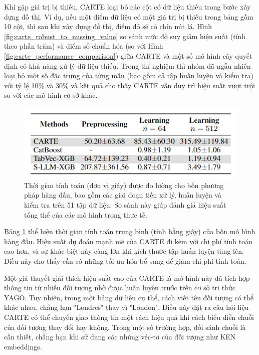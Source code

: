 \documentclass{article}
\begin{document}
Khi gặp giá trị bị thiếu, CARTE loại bỏ các cột có dữ liệu thiếu trong bước xây dựng đồ thị. Ví dụ, nếu một điểm dữ liệu có một giá trị bị thiếu trong bảng gồm 10 cột, thì sau khi xây dựng đồ thị, điểm đó sẽ có chín nút lá. Hình \ref{fig:carte_robust_to_missing_value} so sánh mức độ suy giảm hiệu suất (tính theo phần trăm) và điểm số chuẩn hóa (so với Hình \ref{fig:carte_performance_comparison}) giữa CARTE và một số mô hình cây quyết định có khả năng xử lý dữ liệu thiếu. Trong thí nghiệm thì nhóm đã ngẫu nhiên loại bỏ một số đặc trưng của từng mẫu (bao gồm cả tập huấn luyện và kiểm tra) với tỷ lệ 10\% và 30\% và kết quả cho thấy CARTE vẫn duy trì hiệu suất vượt trội so với các mô hình cơ sở khác.

\begin{figure} 
    \centering
    \includegraphics[scale = 0.8]{carte_computation_time.png}
    \caption{Thời gian tính toán (đơn vị giây) được đo lường cho bốn phương pháp hàng đầu, bao gồm các giai đoạn tiền xử lý, huấn luyện và kiểm tra trên 51 tập dữ liệu. So sánh này giúp đánh giá hiệu suất tổng thể của các mô hình trong thực tế.}
    \label{fig:carte_computation_time}
\end{figure}

Bảng \ref{fig:carte_computation_time} thể hiện thời gian tính toán trung bình (tính bằng giây) của bốn mô hình hàng đầu. Hiệu suất dự đoán mạnh mẽ của CARTE đi kèm với chi phí tính toán cao hơn, và sự khác biệt này càng lớn khi kích thước tập huấn luyện tăng lên. Điều này cho thấy cần có những tối ưu hóa bổ sung để giảm chi phí tính toán.

Một giả thuyết giải thích hiệu suất cao của CARTE là mô hình này đã tích hợp thông tin từ nhiều đối tượng nhờ được huấn luyện trước trên cơ sở tri thức YAGO. Tuy nhiên, trong một bảng dữ liệu cụ thể, cách viết tên đối tượng có thể khác nhau, chẳng hạn "Londres" thay vì "London". Điều này đặt ra câu hỏi liệu CARTE có thể chuyển giao thông tin một cách hiệu quả khi cách biểu diễn chuỗi của đối tượng thay đổi hay không. Trong một số trường hợp, đối sánh chuỗi là cần thiết, chẳng hạn khi sử dụng các nhúng véc-tơ của đối tượng như KEN embeddings.
\end{document}
